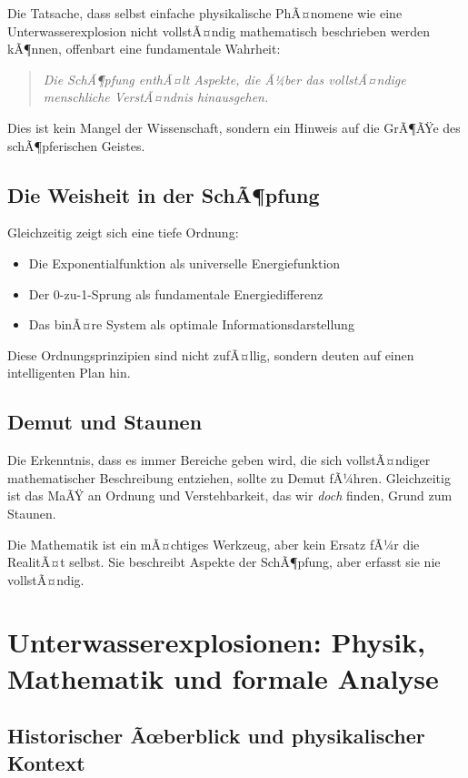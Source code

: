 ﻿\documentclass[12pt,a4paper]{article}
\theoremstyle{definition}
\theoremstyle{remark}
\begin{document}
Die Tatsache, dass selbst einfache physikalische PhÃ¤nomene wie eine Unterwasserexplosion nicht vollstÃ¤ndig mathematisch beschrieben werden kÃ¶nnen, offenbart eine fundamentale Wahrheit:

\begin{quote}
\textit{Die SchÃ¶pfung enthÃ¤lt Aspekte, die Ã¼ber das vollstÃ¤ndige menschliche VerstÃ¤ndnis hinausgehen.}
\end{quote}

Dies ist kein Mangel der Wissenschaft, sondern ein Hinweis auf die GrÃ¶ÃŸe des schÃ¶pfer\-ischen Geistes.

\subsection{Die Weisheit in der SchÃ¶pfung}

Gleichzeitig zeigt sich eine tiefe Ordnung:
\begin{itemize}
\item Die Exponentialfunktion als universelle Energiefunktion
\item Der 0-zu-1-Sprung als fundamentale Energiedifferenz
\item Das binÃ¤re System als optimale Informationsdarstellung
\end{itemize}

Diese Ordnungsprinzipien sind nicht zufÃ¤llig, sondern deuten auf einen intelligenten Plan hin.

\subsection{Demut und Staunen}

Die Erkenntnis, dass es immer Bereiche geben wird, die sich vollstÃ¤ndiger mathematischer Beschreibung entziehen, sollte zu Demut fÃ¼hren. Gleichzeitig ist das MaÃŸ an Ordnung und Verstehbarkeit, das wir \textit{doch} finden, Grund zum Staunen.

Die Mathematik ist ein mÃ¤chtiges Werkzeug, aber kein Ersatz fÃ¼r die RealitÃ¤t selbst. Sie beschreibt Aspekte der SchÃ¶pfung, aber erfasst sie nie vollstÃ¤ndig.

\section{Unterwasserexplosionen: Physik, Mathematik und formale Analyse}
\label{sec:unterwasser}

\subsection{Historischer Ãœberblick und physikalischer Kontext}
\end{document}
